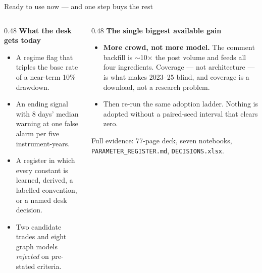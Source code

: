 \documentclass[aspectratio=169,11pt]{beamer}
\begin{document}
\begin{frame}{Ready to use now --- and one step buys the rest}
  \begin{columns}[T]
    \begin{column}{0.48\linewidth}
      \small
      \textbf{What the desk gets today}
      \begin{itemize}\footnotesize
        \item A regime flag that triples the base rate of a near-term 10\%
              drawdown.
        \item An ending signal with 8 days' median warning at one false alarm
              per five instrument-years.
        \item A register in which every constant is learned, derived, a
              labelled convention, or a named desk decision.
        \item Two candidate trades and eight graph models \emph{rejected} on
              pre-stated criteria.
      \end{itemize}
    \end{column}
    \begin{column}{0.48\linewidth}
      \small
      \textbf{The single biggest available gain}
      \begin{itemize}\footnotesize
        \item \textbf{More crowd, not more model.} The comment backfill is
              $\sim$10$\times$ the post volume and feeds all four ingredients.
              Coverage --- not architecture --- is what makes 2023--25 blind,
              and coverage is a download, not a research problem.
        \item Then re-run the same adoption ladder. Nothing is adopted without
              a paired-seed interval that clears zero.
      \end{itemize}
      \vspace{0.2em}
      {\color{gicgrey}\scriptsize Full evidence: 77-page deck, seven notebooks,
       \texttt{PARAMETER\pb{}\_REGISTER.md}, \texttt{DECISIONS.xlsx}.}
    \end{column}
  \end{columns}
\end{frame}
\end{document}

